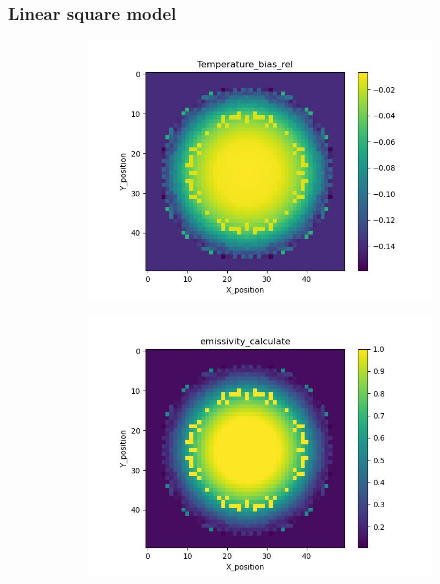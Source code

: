 \subsubsection{Linear square model}

\begin{figure}[htbp]
    \centering
    \begin{minipage}{\textwidth}
        \centering
        \begin{subfigure}{0.49\textwidth}
            \centering
            \includegraphics[width=\textwidth]{figures/raw_data/0/lin_square/T_bias.jpg}
        \end{subfigure}
        \begin{subfigure}{0.49\textwidth}
            \centering
            \includegraphics[width=\textwidth]{figures/raw_data/0/lin_square/emi_cal.jpg}

\end{subfigure}
\end{minipage}
\end{figure}

